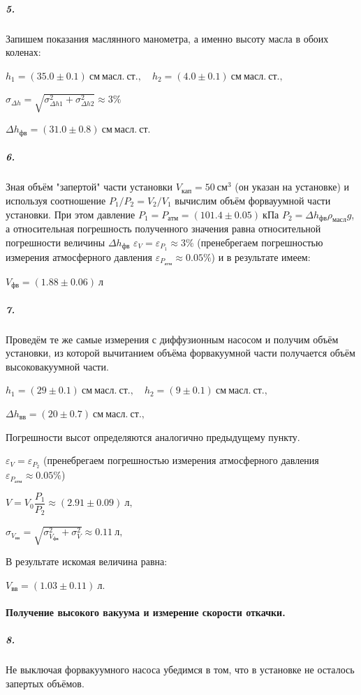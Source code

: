 \documentclass[a4paper,12pt]{article}
\begin{document}
\subparagraph{5.} Запишем показания маслянного манометра, а именно высоту масла в обоих коленах: 

$
h_1 = (35.0 \pm 0.1)~см~масл. ~ст.,\quad  h_2 = (4.0 \pm 0.1)~ см ~масл. ~ст.,
$

$\sigma_{\Delta h} = \sqrt{\sigma_{\Delta h1}^2 + \sigma_{\Delta h2}^2}\approx 3 \%$

$
\Delta h_{фв} = (31.0 \pm 0.8) ~ см ~масл. ~ст.
$

\subparagraph{6.} Зная объём "запертой"  части установки $V_{кап} = 50 ~ см^3$ (он указан на установке) и используя соотношение $P_1/P_2=V_2/V_1$ вычислим объём форвауумной части установки. При этом давление $P_1 = P_{атм} = (101.4 \pm 0.05) ~ кПа$ $P_2 = \Delta h_{фв}  \rho_{масл} g$, а относительная погрешность полученного значения равна относительной погрешности величины $\Delta h_{фв} $ 
$
\varepsilon_V = \varepsilon_{P_1} \approx 3\%
$
(пренебрегаем погрешностью измерения атмосферного давления $\varepsilon_{P_{атм}} \approx 0.05 \%$) и в результате имеем: 

$
V_{фв} = (1.88 \pm 0.06)~ л
$

\subparagraph{7.} Проведём те же самые измерения с диффузионным насосом и получим объём установки, из которой вычитанием объёма форвакуумной части получается объём высоковакуумной части. 

$
h_1 = (29 \pm 0.1)~см~масл. ~ст., \quad h_2 = (9\pm 0.1)~ см ~масл. ~ст.,
$


$
\Delta h_{вв} = (20 \pm 0.7) ~ см ~масл. ~ст.,
$

Погрешности высот определяются аналогично предыдущему пункту. 

$
\varepsilon_V = \varepsilon_{P_2}
$
(пренебрегаем погрешностью измерения атмосферного давления $\varepsilon_{P_{атм}} \approx 0.05 \%$)

$
V = V_0 \dfrac{P_1}{P_2} \approx (2.91 \pm 0.09) ~ л,
$

$
\sigma_{V_{вв}} = \sqrt{\sigma_{V_{фв}}^2 + \sigma_{V}^2} \approx 0.11~л,
$

 В результате искомая величина равна: 

$
V_{вв} = (1.03 \pm 0.11) ~ л.
$


\paragraph{Получение высокого вакуума и измерение скорости откачки.}

\subparagraph*{8.} Не выключая форвакуумного насоса убедимся в том, что в установке не осталось запертых объёмов. 
\end{document}
